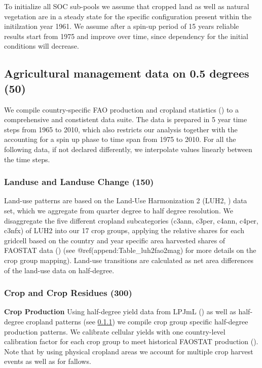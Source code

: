 \documentclass[gc, manuscript]{copernicus}
\begin{document}
To initialize all SOC sub-pools we assume that cropped land as well as natural vegetation are in a steady state for the specific configuration present within the initilzation year 1961. We assume after a spin-up period of 15 years reliable results start from 1975 and improve over time, since dependency for the initial conditions will decrease.

\newpage

\hypertarget{sec:agrimanagement}{%
\subsection{Agricultural management data on 0.5 degrees (50)}\label{sec:agrimanagement}}

We compile country-specific FAO production and cropland statistics (\citep{FAOSTAT}) to a comprehensive and constistent data suite. The data is prepared in 5 year time steps from 1965 to 2010, which also restricts our analysis together with the accounting for a spin up phase to time span from 1975 to 2010. For all the following data, if not declared differently, we interpolate values linearly between the time steps.

\hypertarget{sec:landuse}{%
\subsubsection{Landuse and Landuse Change (150)}\label{sec:landuse}}

Land-use patterns are based on the Land-Use Harmonization 2 (LUH2, \citep{LUH2}) data set, which we aggregate from quarter degree to half degree resolution. We disaggregate the five different cropland subcategories (c3ann, c3per, c4ann, c4per, c3nfx) of LUH2 into our 17 crop groups, applying the relative shares for each gridcell based on the country and year specific area harvested shares of FAOSTAT data (\citep{FAOSTAT}) (see @ref(append:Table\_luh2fao2mag) for more details on the crop group mapping). Land-use transitions are calculated as net area differences of the land-use data on half-degree.

\hypertarget{sec:residues}{%
\subsubsection{Crop and Crop Residues (300)}\label{sec:residues}}

\textbf{Crop Production}
Using half-degree yield data from LPJmL (\citep{LPJmL4_1}) as well as half-degree cropland patterns (see \ref{sec:landuse}) we compile crop group specific half-degree production patterns. We calibrate cellular yields with one country-level calibration factor for each crop group to meet historical FAOSTAT production (\citep{FAOSTAT}). Note that by using physical cropland areas we account for multiple crop harvest events as well as for fallows.
\end{document}
